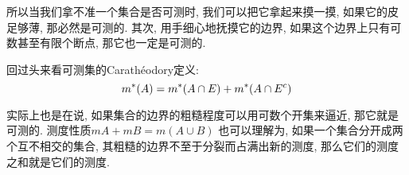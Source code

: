 所以当我们拿不准一个集合是否可测时, 我们可以把它拿起来摸一摸, 如果它的皮足够薄, 那必然是可测的. 其次,
用手细心地抚摸它的边界, 如果这个边界上只有可数甚至有限个断点, 那它也一定是可测的.

回过头来看可测集的Carathéodory定义: \[
    m^{*}(A)=m^{*}(A\cap E)+m^{*}(A\cap E^{c})
\]

实际上也是在说, 如果集合的边界的粗糙程度可以用可数个开集来逼近, 那它就是可测的.
测度性质\(mA+mB=m(A\cup B)\) 也可以理解为, 如果一个集合分开成两个互不相交的集合,
其粗糙的边界不至于分裂而占满出新的测度, 那么它们的测度之和就是它们的测度.
